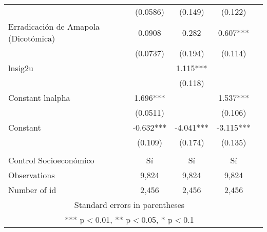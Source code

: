 {\begin{tabular}{lcccc}
& (0.0586) & (0.149) & (0.122) \\
Erradicación de Amapola (Dicotómica) & 0.0908 & 0.282 & 0.607*** \\
& (0.0737) & (0.194) & (0.114) \\
\hline\hline
lnsig2u &  & 1.115***&  \\
  &  & (0.118)  &  \\
Constant lnalpha  & 1.696*** &  & 1.537*** \\
 & (0.0511) &  & (0.106) \\
Constant  & -0.632***  &   -4.041*** & -3.115*** \\
 & (0.109)  & (0.174)& (0.135) \\
 &  &  &  \\
\hline\hline
Control Socioeconómico  & Sí & Sí & Sí \\
\hline\hline
Observations & 9,824 & 9,824 & 9,824 \\
 Number of id & 2,456 & 2,456 & 2,456 \\ \hline
\multicolumn{4}{c}{ Standard errors in parentheses} \\
\multicolumn{4}{c}{ *** p$<$0.01, ** p$<$0.05, * p$<$0.1} \\
\end{tabular}
}